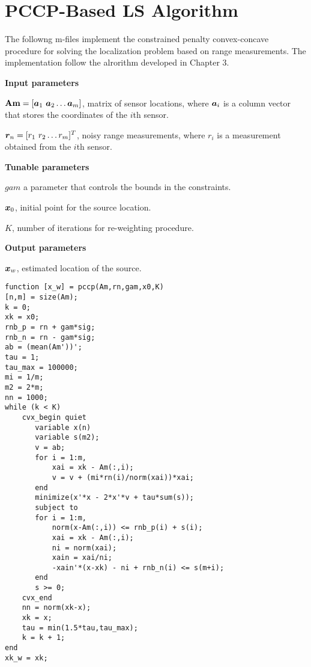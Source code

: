 \section{PCCP-Based LS Algorithm}

The followng m-files implement the constrained penalty convex-concave procedure for solving the localization problem based on range measurements. The implementation follow the alrorithm developed in Chapter 3.

\phantom{m}

\noindent
\textbf{Input parameters}

\noindent
$\mbox{\textbf{Am}} = [\mbox{\boldmath$a$}_1 \ \mbox{\boldmath$a$}_2 \ldots \mbox{\boldmath$a$}_m]$, matrix of sensor locations, where $\mbox{\boldmath$a$}_i$ is a column vector that stores the coordinates of the $i$th sensor.

\noindent
$\mbox{\boldmath$r$}_n = [r_1 \ r_2 \ldots r_m]^T$, noisy range measurements, where $r_i$ is a measurement obtained from the $i$th sensor.

\noindent
\textbf{Tunable parameters}

\noindent
$gam$ a parameter that controls the bounds in the constraints.

\noindent
$\mbox{\boldmath$x$}_0$, initial point for the source location.

\noindent
$K$, number of iterations for re-weighting procedure.

\noindent
\textbf{Output parameters}

\noindent
$\mbox{\boldmath$x$}_w$, estimated location of the source.

\phantom{m}

\begin{lstlisting}
function [x_w] = pccp(Am,rn,gam,x0,K)
[n,m] = size(Am);
k = 0;
xk = x0;
rnb_p = rn + gam*sig;
rnb_n = rn - gam*sig;
ab = (mean(Am'))';
tau = 1;
tau_max = 100000;
mi = 1/m;
m2 = 2*m;
nn = 1000;
while (k < K) 
    cvx_begin quiet
       variable x(n)
       variable s(m2);
       v = ab;
       for i = 1:m,
           xai = xk - Am(:,i);
           v = v + (mi*rn(i)/norm(xai))*xai;
       end
       minimize(x'*x - 2*x'*v + tau*sum(s));
       subject to
       for i = 1:m,
           norm(x-Am(:,i)) <= rnb_p(i) + s(i);
           xai = xk - Am(:,i);
           ni = norm(xai);
           xain = xai/ni;
           -xain'*(x-xk) - ni + rnb_n(i) <= s(m+i);
       end
       s >= 0;
    cvx_end
    nn = norm(xk-x);
    xk = x;
    tau = min(1.5*tau,tau_max);
    k = k + 1;
end
xk_w = xk;
\end{lstlisting}

\newpage

